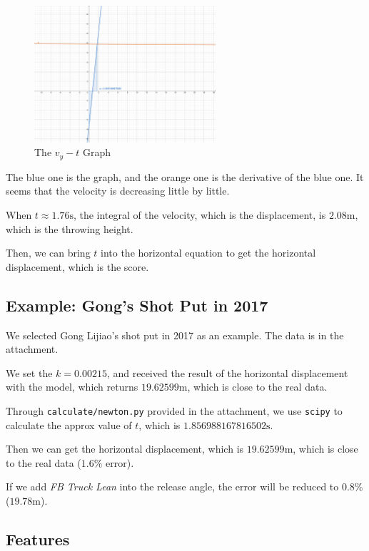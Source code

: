 \documentclass{article}
\begin{document}
\begin{figure}[H]
    \centering
    \includegraphics[width=0.6\textwidth]{figures/figure-1.pdf}
    \caption{The $v_y-t$ Graph}
    \label{fig:vy-t}
\end{figure}

The blue one is the graph, and the orange one is the derivative of the blue one. It seems that the velocity is decreasing little by little.

When $t \approx 1.76 \si{\second}$, the integral of the velocity, which is the displacement, is $2.08 \si{\meter}$, which is the throwing height.

Then, we can bring $t$ into the horizontal equation to get the horizontal displacement, which is the score.

\subsection{Example: Gong's Shot Put in 2017}

We selected Gong Lijiao's shot put in 2017 as an example. The data is in the attachment.

We set the $k = 0.00215$, and received the result of the horizontal displacement with the model, which returns $19.62599 \si{\meter}$, which is close to the real data.

Through \texttt{calculate/newton.py} provided in the attachment, we use \texttt{scipy} to calculate the approx value of $t$, which is $1.856988167816502 \si{\second}$.

Then we can get the horizontal displacement, which is $19.62599 \si{\meter}$, which is close to the real data ($1.6\%$ error).

If we add \textit{FB Truck Lean} into the release angle, the error will be reduced to $0.8\%$ ($19.78 \si{\meter}$).

\subsection{Features}
\end{document}
